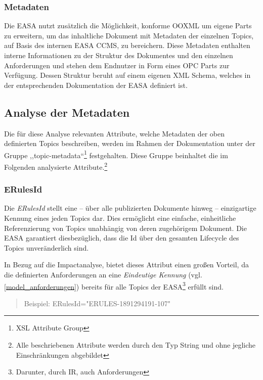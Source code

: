             \subsubsection{Metadaten}

    Die \ac{EASA} nutzt zusätzlich die Möglichkeit, konforme \ac{OOXML} um eigene Parts zu erweitern, um das inhaltliche Dokument mit Metadaten der einzelnen Topics, auf Basis des internen \ac{EASA} \ac{CCMS}, zu bereichern.
    Diese Metadaten enthalten interne Informationen zu der Struktur des Dokumentes und den einzelnen Anforderungen und stehen dem Endnutzer in Form eines \ac{OPC} Parts  zur Verfügung.
    Dessen Struktur beruht auf einem eigenen \ac{XML} Schema, welches in der entsprechenden Dokumentation der \ac{EASA} definiert ist.

\pagebreak
\subsection{Analyse der Metadaten}

    Die für diese Analyse relevanten Attribute, welche Metadaten der oben definierten Topics beschreiben, werden im Rahmen der Dokumentation unter der Gruppe ,,\textsf{topic-metadata}``\footnote{\ac{XSL} Attribute Group} festgehalten.
    Diese Gruppe beinhaltet die im Folgenden analysierte Attribute.\footnote{Alle beschriebenen Attribute werden durch den Typ String und ohne jegliche Einschränkungen abgebildet} \cite[9]{easa_xml_schema}

    \subsubsection{ERulesId}

Die \textit{ERulesId} stellt eine -- über alle publizierten Dokumente hinweg -- einzigartige Kennung eines jeden Topics dar.
Dies ermöglicht eine einfache, einheitliche Referenzierung von Topics unabhängig von deren zugehörigem Dokument.
Die \ac{EASA} garantiert diesbezüglich, dass die Id über den gesamten Lifecycle des Topics unveränderlich sind. \cite[17]{easa_xml_doc}

In Bezug auf die Impactanalyse, bietet dieses Attribut einen großen Vorteil, da die definierten Anforderungen an eine \textit{Eindeutige Kennung} (vgl. \ref{model_anforderungen}) bereits für alle Topics der \ac{EASA}\footnote{Darunter, durch \ac{IR}, auch \atmans Anforderungen} erfüllt sind.
\begin{quote}
Beispiel:
\textsf{ERulesId="{}ERULES-1891294191-107"}
\end{quote}

